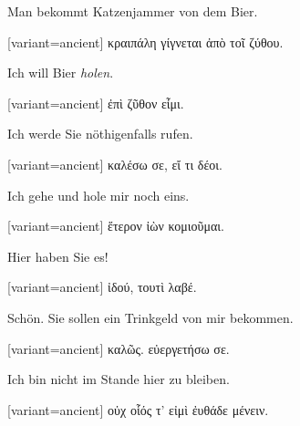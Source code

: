 Man bekommt Katzenjammer von dem Bier.

\switchcolumn

\begin{greek}[variant=ancient]%
κραιπάλη γίγνεται ἀπὸ τοῖ ζύθου.

\end{greek}%
\switchcolumn*

Ich will Bier \emph{holen}.

\switchcolumn

\begin{greek}[variant=ancient]%
ἐπὶ ζῦθον εἶμι.

\end{greek}%
\switchcolumn*

Ich werde Sie nöthigenfalls rufen.

\switchcolumn

\begin{greek}[variant=ancient]%
καλέσω σε, εἴ τι δέοι.

\end{greek}%
\switchcolumn*

Ich gehe und hole mir noch eins.

\switchcolumn

\begin{greek}[variant=ancient]%
ἕτερον ἰὼν κομιοῦμαι.

\end{greek}%
\switchcolumn*

Hier haben Sie es!

\switchcolumn

\begin{greek}[variant=ancient]%
ἰδού, τουτὶ λαβέ.

\end{greek}%
\switchcolumn*

Schön. Sie sollen ein Trinkgeld von mir bekommen.

\switchcolumn

\begin{greek}[variant=ancient]%
καλῶς. εὐεργετήσω σε.

\end{greek}%
\switchcolumn*

Ich bin nicht im Stande hier zu bleiben.

\switchcolumn

\begin{greek}[variant=ancient]%
οὐχ οἷός τ' εἰμὶ ἐυθάδε μένειν.

\end{greek}%
\switchcolumn*

